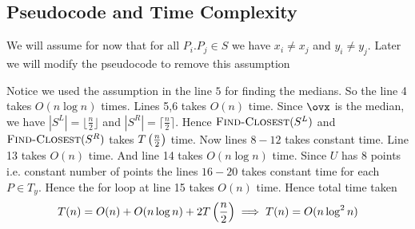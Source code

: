 \subsection{Pseudocode and Time Complexity}
\begin{assumption*}
	We will assume for now that for all $P_i.P_j\in S$ we have $x_i\neq x_j$ and $y_i\neq y_j$. Later we will modify the pseudocode to remove this assumption
\end{assumption*}
\begin{algorithm}
	\DontPrintSemicolon

	\caption{\textsc{Find-Closest}($S$)}
	\label{find-closest-nlog2n}
\end{algorithm}

Notice we used the assumption in the line $5$ for finding the medians. So the line 4 takes $O(n\log n)$ times. Lines 5,6 takes $O(n)$ time. Since $\ovx$ is the median, we have  $|S^L|=\lfloor \frac{n}2\rfloor$ and $|S^R|=\lceil \frac{n}{2}\rceil$. Hence $\textsc{Find-Closest}(S^L)$ and $\textsc{Find-Closest}(S^R)$ takes $T\left(\frac{n}{2}\right)$ time. Now lines $8-12$ takes constant time. Line 13 takes $O(n)$ time. And line 14 takes $O(n\log n)$ time. Since $U$ has 8 points i.e. constant number of points the lines $16-20$ takes constant time for each $P\in T_y$. Hence the for loop at line 15 takes $O(n)$ time. Hence total time taken $$T(n)=O(n)+O(n\log n)+2T\left(\frac{n}2\right)\implies T(n)=O(n\log^2n)$$
